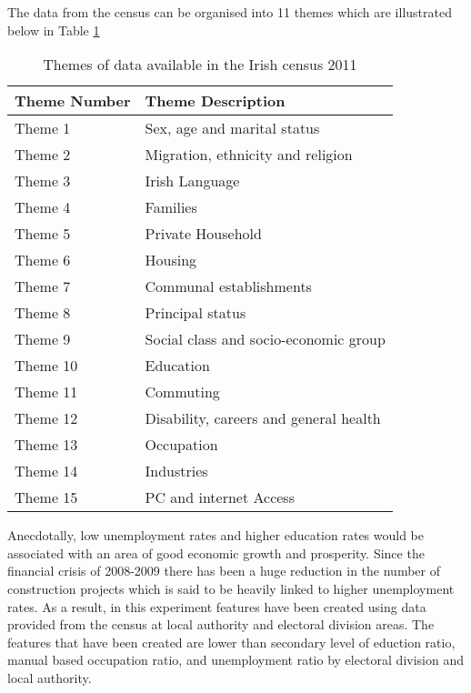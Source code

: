 The data from the census can be organised into 11 themes which are illustrated below in Table \ref{table:censusThemes}

\begin{table}[H]
	\centering
	\small
	\begin{tabular}{|l|l|}
		\hline
		\textbf{Theme Number} & \textbf{Theme Description} \\ \hline
		Theme 1    & Sex, age and marital status \\ \hline
		Theme 2    & Migration, ethnicity and religion \\ \hline
		Theme 3    & Irish Language \\ \hline
		Theme 4    & Families \\ \hline
		Theme 5    & Private Household \\ \hline
		Theme 6    & Housing \\ \hline
		Theme 7	   & Communal establishments \\ \hline
		Theme 8    & Principal status \\ \hline
		Theme 9    & Social class and socio-economic group \\ \hline
		Theme 10   & Education \\ \hline
		Theme 11   & Commuting \\ \hline	
		Theme 12   & Disability, careers and general health \\ \hline		
		Theme 13   & Occupation \\ \hline
		Theme 14   & Industries \\ \hline
		Theme 15   & PC and internet Access \\ \hline			
	\end{tabular}
	\caption{Themes of data available in the Irish census 2011}
	\label{table:censusThemes}
\end{table}


Anecdotally, low unemployment rates and higher education rates would be associated with an area of good economic growth and prosperity. Since the financial crisis of 2008-2009 there has been a huge reduction in the number of construction projects which is said to be heavily linked to higher unemployment rates. As a result, in this experiment features have been created using data provided from the census at local authority and electoral division areas. The features that have been created are lower than secondary level of eduction ratio, manual based occupation ratio, and unemployment ratio by electoral division and local authority.


